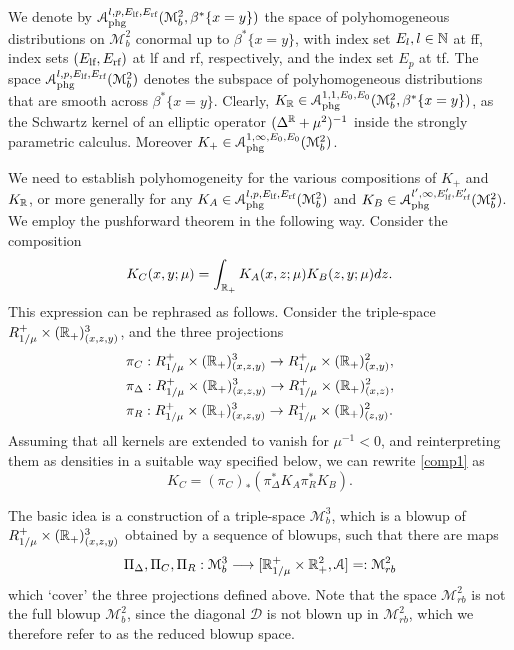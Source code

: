 We denote by $\mathscr{A}_{\textup{phg}}^{l,p,E_{\textup{lf}}, 
E_{\textup{rf}}}(\mathscr{M}^2_b, \beta^*\{x=y\})$ 
the space of polyhomogeneous distributions on
$\mathscr{M}^2_b$ conormal up to $\beta^*\{x=y\}$, with index set
$E_l, l\in \N$ at ff, index sets $(E_{\textup{lf}}, E_{\textup{rf}})$ 
at lf and rf, respectively, and the index set $E_p$ at tf. The 
space $\mathscr{A}_{\textup{phg}}^{l,p,E_{\textup{lf}}, 
E_{\textup{rf}}}(\mathscr{M}^2_b)$ denotes the subspace 
of polyhomogeneous distributions that are smooth across $\beta^*\{x=y\}$. Clearly, 
$K_\R \in \mathscr{A}_{\textup{phg}}^{1,1,E_0, E_0}(\mathscr{M}^2_b,\beta^*\{x=y\})$, 
as the Schwartz kernel of an elliptic operator $(\Delta^\R +\mu^2)^{-1}$ inside the 
strongly parametric calculus. Moreover $K_+ \in \mathscr{A}_{\textup{phg}}^{1,\infty ,E_0, E_0}
(\mathscr{M}^2_b)$.

We need to establish polyhomogeneity for the various compositions 
of $K_+$ and $K_\R$, or more generally for any 
$K_A \in \mathscr{A}_{\textup{phg}}^{l,p,E_{\textup{lf}}, E_{\textup{rf}}}(\mathscr{M}^2_b)$ 
and $K_B \in \mathscr{A}_{\textup{phg}}^{l',\infty,E'_{\textup{lf}}, E'_{\textup{rf}}}(\mathscr{M}^2_b)$.  
We employ the pushforward theorem in the following way. Consider the composition
\begin{equation}
K_{C}(x,y;\mu) = \int_{\R_+} K_A(x,z;\mu) K_B(z,y;\mu) dz.
\label{comp1}
\end{equation}
This expression can be rephrased as follows. 
 Consider the triple-space $R^+_{1/\mu}\times (\R_+)^3_{(x,z,y)}$, and the three projections
\begin{equation}
\begin{split}
&\pi_C :R^+_{1/\mu}\times (\R_+)^3_{(x,z,y)} \to R^+_{1/\mu}\times (\R_+)^2_{(x,y)}, \\
&\pi_\Delta: R^+_{1/\mu}\times (\R_+)^3_{(x,z,y)} \to R^+_{1/\mu}\times (\R_+)^2_{(x,z)}, \\
&\pi_R: R^+_{1/\mu}\times (\R_+)^3_{(x,z,y)} \to R^+_{1/\mu}\times (\R_+)^2_{(z,y)}.
\end{split}
\label{projections}
\end{equation} 
Assuming that all kernels are extended to vanish for $\mu^{-1}<0$, 
and reinterpreting them as densities in a suitable way specified below, we can rewrite \eqref{comp1} as
\[
K_C = (\pi_C)_* \left( \pi_\Delta^* K_A  \pi_R^* K_B \right).
\]

The basic idea is a construction of a triple-space $\mathscr{M}^3_b$,
which is a blowup of $R^+_{1/\mu}\times (\R_+)^3_{(x,z,y)}$ obtained 
by a sequence of blowups, such that there are maps
\[
\Pi_\Delta, \Pi_C, \Pi_R:  \mathscr{M}^3_b \longrightarrow 
[\R^+_{1/\mu}\times \R_+^2, \mathscr{A}]=:  \mathscr{M}^2_{rb}
\]
which `cover' the three projections defined above. Note that the 
space $\mathscr{M}^2_{rb}$ is not the full blowup $ \mathscr{M}^2_{b}$, 
since the diagonal $\mathscr{D}$ is not blown up in $\mathscr{M}^2_{rb}$, 
which we therefore refer to as the reduced blowup space.


